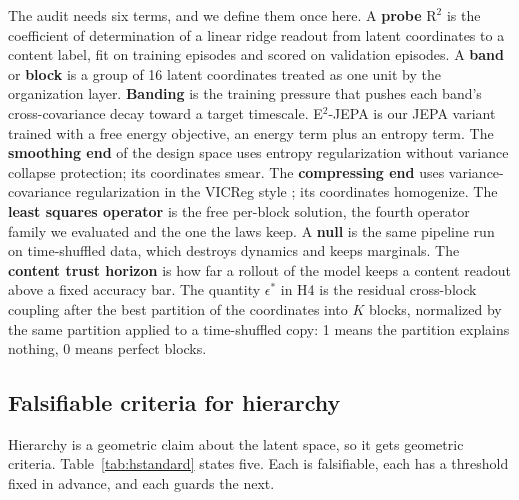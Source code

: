 \documentclass[11pt]{article}
\newcommand{\term}[1]{\textbf{#1}}
\begin{document}
The audit needs six terms, and we define them once here.
A \term{probe} $\mathrm{R}^2$ is the coefficient of determination of a linear ridge readout from latent coordinates to a content label, fit on training episodes and scored on validation episodes.
A \term{band} or \term{block} is a group of 16 latent coordinates treated as one unit by the organization layer.
\term{Banding} is the training pressure that pushes each band's cross-covariance decay toward a target timescale.
E$^2$-JEPA is our JEPA variant trained with a free energy objective, an energy term plus an entropy term.
The \term{smoothing end} of the design space uses entropy regularization without variance collapse protection; its coordinates smear.
The \term{compressing end} uses variance-covariance regularization in the VICReg style \citep{vicreg}; its coordinates homogenize.
The \term{least squares operator} is the free per-block solution, the fourth operator family we evaluated and the one the laws keep.
A \term{null} is the same pipeline run on time-shuffled data, which destroys dynamics and keeps marginals.
The \term{content trust horizon} is how far a rollout of the model keeps a content readout above a fixed accuracy bar.
The quantity $\epsilon^*$ in H4 is the residual cross-block coupling after the best partition of the coordinates into $K$ blocks, normalized by the same partition applied to a time-shuffled copy: 1 means the partition explains nothing, 0 means perfect blocks.

\subsection{Falsifiable criteria for hierarchy}

Hierarchy is a geometric claim about the latent space, so it gets geometric criteria.
Table~\ref{tab:hstandard} states five.
Each is falsifiable, each has a threshold fixed in advance, and each guards the next.
\end{document}
